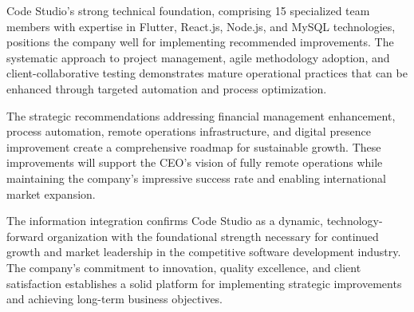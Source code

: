 \documentclass[12pt,a4paper]{article}
\begin{document}
Code Studio's strong technical foundation, comprising 15 specialized team members with expertise in Flutter, React.js, Node.js, and MySQL technologies, positions the company well for implementing recommended improvements. The systematic approach to project management, agile methodology adoption, and client-collaborative testing demonstrates mature operational practices that can be enhanced through targeted automation and process optimization.

The strategic recommendations addressing financial management enhancement, process automation, remote operations infrastructure, and digital presence improvement create a comprehensive roadmap for sustainable growth. These improvements will support the CEO's vision of fully remote operations while maintaining the company's impressive success rate and enabling international market expansion.

The information integration confirms Code Studio as a dynamic, technology-forward organization with the foundational strength necessary for continued growth and market leadership in the competitive software development industry. The company's commitment to innovation, quality excellence, and client satisfaction establishes a solid platform for implementing strategic improvements and achieving long-term business objectives.
\end{document}
